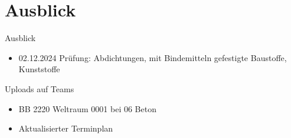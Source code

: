 \section{Ausblick}

\begin{frame}{Ausblick}
	\begin{itemize}
		\item 02.12.2024 Prüfung: Abdichtungen, mit Bindemitteln gefestigte Baustoffe, Kunststoffe
	\end{itemize}
\end{frame}

\begin{frame}{Uploads auf Teams}
    \begin{itemize}
        \item BB 2220 Weltraum 0001 bei 06 Beton
        \item Aktualisierter Terminplan
    \end{itemize}
    
\end{frame}

